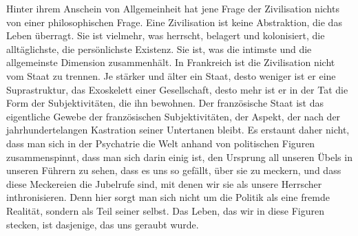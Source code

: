 \extrapar{}

Hinter ihrem Anschein von Allgemeinheit hat jene Frage der
Zivilisation nichts von einer philosophischen Frage. Eine
Zivilisation ist keine Abstraktion, die das Leben überragt. Sie ist
vielmehr, was herrscht, belagert und kolonisiert, die
alltäglichste, die persönlichste Existenz. Sie ist, was die
intimste und die allgemeinste Dimension zusammenhält. In Frankreich
ist die Zivilisation nicht vom Staat zu trennen. Je stärker und
älter ein Staat, desto weniger ist er eine Suprastruktur, das
Exoskelett einer Gesellschaft, desto mehr ist er in der Tat die
Form der Subjektivitäten, die ihn bewohnen. Der französische Staat
ist das eigentliche Gewebe der französischen Subjektivitäten, der
Aspekt, der nach der jahrhundertelangen Kastration seiner
Untertanen bleibt. Es erstaunt daher nicht, dass man sich in der
Psychatrie die Welt anhand von politischen Figuren zusammenspinnt,
dass man sich darin einig ist, den Ursprung all unseren Übels in
unseren Führern zu sehen, dass es uns so gefällt, über sie zu
meckern, und dass diese Meckereien die Jubelrufe sind, mit denen
wir sie als unsere Herrscher inthronisieren. Denn hier sorgt man
sich nicht um die Politik als eine fremde Realität, sondern als
Teil seiner selbst. Das Leben, das wir in diese Figuren stecken,
ist dasjenige, das uns geraubt wurde.
\extrapar{}

